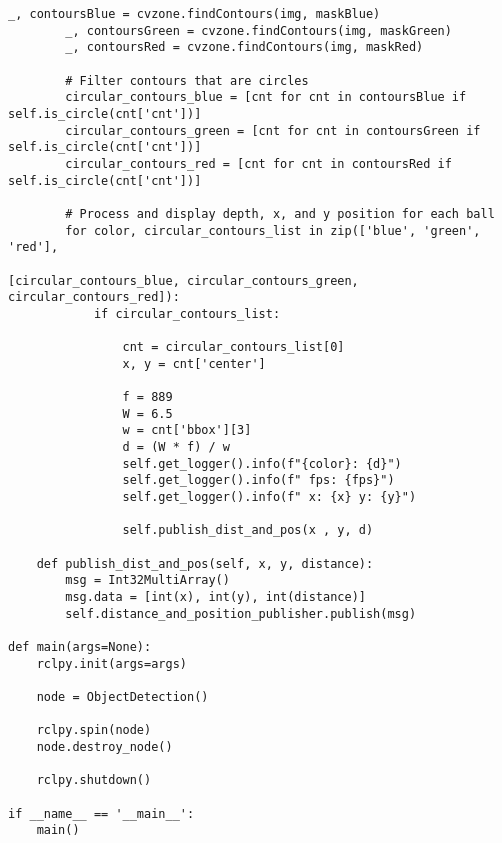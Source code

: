 \begin{lstlisting}[language=PythonPlus, basicstyle=\tiny,]
        _, contoursBlue = cvzone.findContours(img, maskBlue)
        _, contoursGreen = cvzone.findContours(img, maskGreen)
        _, contoursRed = cvzone.findContours(img, maskRed)

        # Filter contours that are circles
        circular_contours_blue = [cnt for cnt in contoursBlue if self.is_circle(cnt['cnt'])]
        circular_contours_green = [cnt for cnt in contoursGreen if self.is_circle(cnt['cnt'])]
        circular_contours_red = [cnt for cnt in contoursRed if self.is_circle(cnt['cnt'])]

        # Process and display depth, x, and y position for each ball
        for color, circular_contours_list in zip(['blue', 'green', 'red'],
                                                [circular_contours_blue, circular_contours_green, circular_contours_red]):
            if circular_contours_list:

                cnt = circular_contours_list[0]
                x, y = cnt['center']

                f = 889
                W = 6.5
                w = cnt['bbox'][3]
                d = (W * f) / w
                self.get_logger().info(f"{color}: {d}")
                self.get_logger().info(f" fps: {fps}")
                self.get_logger().info(f" x: {x} y: {y}")

                self.publish_dist_and_pos(x , y, d)

    def publish_dist_and_pos(self, x, y, distance):
        msg = Int32MultiArray()
        msg.data = [int(x), int(y), int(distance)]
        self.distance_and_position_publisher.publish(msg)

def main(args=None): 
    rclpy.init(args=args) 

    node = ObjectDetection()

    rclpy.spin(node)
    node.destroy_node()

    rclpy.shutdown() 

if __name__ == '__main__':
    main()

\end{lstlisting}

